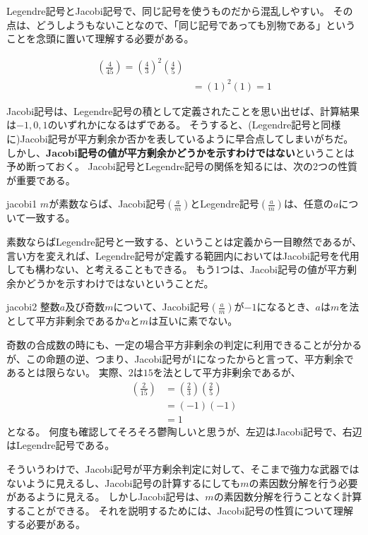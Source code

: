 Legendre記号とJacobi記号で、同じ記号を使うものだから混乱しやすい。
その点は、どうしようもないことなので、「同じ記号であっても別物である」ということを念頭に置いて理解する必要がある。

\begin{Exam}{}{}
\begin{align*}
\left(\frac{4}{45}\right) = \left(\frac{4}{3}\right)^2\left(\frac{4}{5}\right)\\
&= (1)^2(1) = 1
\end{align*}
\end{Exam}

Jacobi記号は、Legendre記号の積として定義されたことを思い出せば、計算結果は$-1,0,1$のいずれかになるはずである。
そうすると、(Legendre記号と同様に)Jacobi記号が平方剰余か否かを表しているように早合点してしまいがちだ。
しかし、\textbf{Jacobi記号の値が平方剰余かどうかを示すわけではない}ということは予め断っておく。
Jacobi記号とLegendre記号の関係を知るには、次の2つの性質が重要である。

\begin{Prop}{}{jacobi1}
$m$が素数ならば、Jacobi記号$\left(\frac{a}{m}\right)$とLegendre記号$\left(\frac{a}{m}\right)$は、任意の$a$について一致する。
\end{Prop}

素数ならばLegendre記号と一致する、ということは定義から一目瞭然であるが、言い方を変えれば、Legendre記号が定義する範囲内においてはJacobi記号を代用しても構わない、と考えることもできる。
もう1つは、Jacobi記号の値が平方剰余かどうかを示すわけではないということだ。

\begin{Prop}{}{jacobi2}
整数$a$及び奇数$m$について、Jacobi記号$\left(\frac{a}{m}\right)$が$-1$になるとき、$a$は$m$を法として平方非剰余であるか$a$と$m$は互いに素でない。
\end{Prop}

奇数の合成数の時にも、一定の場合平方非剰余の判定に利用できることが分かるが、この命題の逆、つまり、Jacobi記号が1になったからと言って、平方剰余であるとは限らない。
実際、$2$は$15$を法として平方非剰余であるが、
\begin{align*}
\left(\frac{2}{15}\right) &= \left(\frac{2}{3}\right)\left(\frac{2}{5}\right)\\
&= (-1)(-1)\\
&= 1
\end{align*}
となる。
何度も確認してそろそろ鬱陶しいと思うが、左辺はJacobi記号で、右辺はLegendre記号である。

そういうわけで、Jacobi記号が平方剰余判定に対して、そこまで強力な武器ではないように見えるし、Jacobi記号の計算するにしても$m$の素因数分解を行う必要があるように見える。
しかしJacobi記号は、$m$の素因数分解を行うことなく計算することができる。
それを説明するためには、Jacobi記号の性質について理解する必要がある。

